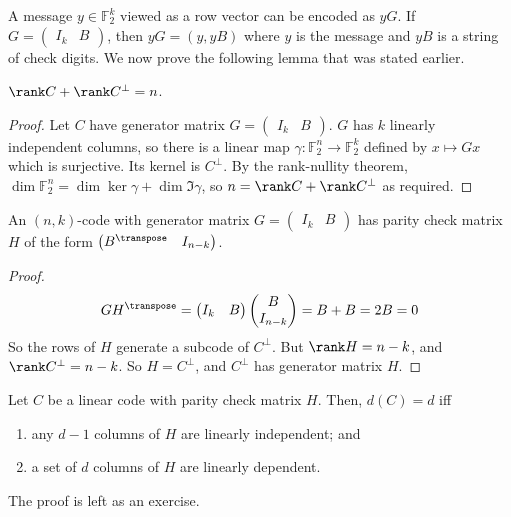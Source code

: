 A message $y \in \mathbb F_2^k$ viewed as a row vector can be encoded as $yG$.
If $G = \begin{pmatrix}
    I_k & B
\end{pmatrix}$, then $yG = (y, yB)$ where $y$ is the message and $yB$ is a string of check digits.
We now prove the following lemma that was stated earlier.
\begin{lemma}
    $\rank C + \rank C^\perp = n$.
\end{lemma}
\begin{proof}
    Let $C$ have generator matrix $G = \begin{pmatrix}
        I_k & B
    \end{pmatrix}$.
    $G$ has $k$ linearly independent columns, so there is a linear map $\gamma \colon \mathbb F_2^n \to \mathbb F_2^k$ defined by $x \mapsto Gx$ which is surjective.
    Its kernel is $C^\perp$.
    By the rank-nullity theorem, $\dim \mathbb F_2^n = \dim \ker \gamma + \dim \Im \gamma$, so $n = \rank C + \rank C^\perp$ as required.
\end{proof}
\begin{lemma}
    An $(n, k)$-code with generator matrix $G = \begin{pmatrix}
        I_k & B
    \end{pmatrix}$ has parity check matrix $H$ of the form $\begin{pmatrix}
        B^\transpose & I_{n-k}
    \end{pmatrix}$.
\end{lemma}
\begin{proof}
    \begin{align*}
        GH^\transpose = \begin{pmatrix}
            I_k & B
        \end{pmatrix} \begin{pmatrix}
            B \\
            I_{n-k}
        \end{pmatrix} = B + B = 2B = 0
    \end{align*}
    So the rows of $H$ generate a subcode of $C^\perp$.
    But $\rank H = n - k$, and $\rank C^\perp = n - k$.
    So $H = C^\perp$, and $C^\perp$ has generator matrix $H$.
\end{proof}
\begin{lemma}
    Let $C$ be a linear code with parity check matrix $H$.
    Then, $d(C) = d$ iff
    \begin{enumerate}
        \item any $d - 1$ columns of $H$ are linearly independent; and
        \item a set of $d$ columns of $H$ are linearly dependent.
    \end{enumerate}
\end{lemma}
The proof is left as an exercise.


